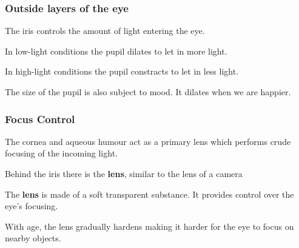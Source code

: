 \documentclass[12pt]{beamer}\usepackage[]{graphicx}\usepackage[]{color}
\begin{document}

\begin{frame}
\frametitle{Outside layers of the eye}

\bbi
  \item The iris controls the amount of light entering the eye.
  \item In low-light conditions the pupil dilates to let in more light.
  \item In high-light conditions the pupil constracts to let in less light.
  \item The size of the pupil is also subject to mood. It dilates when we are
  happier.
\ei
\eb

\end{frame}


\begin{frame}
\begin{center}
\end{center}
\end{frame}


\begin{frame}
\frametitle{Focus Control}

\bbi
  \item The cornea and aqueous humour act as a primary lens which performs
  crude focusing of the incoming light.
  \item Behind the iris there is the \textbf{lens}, similar to the lens of
  a camera
  \item The \textbf{lens} is made of a soft transparent substance. It provides
  control over the eye's focusing.
  \item With age, the lens gradually hardens making it harder for the eye to
  focus on nearby objects.
\ei

\end{frame}


\begin{frame}
\begin{center}
\end{center}
\end{frame}

\end{document}
